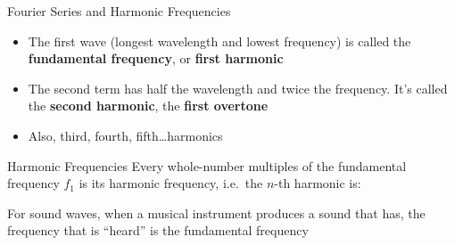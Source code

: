 \documentclass[12pt,aspectratio=169]{beamer}
\newcommand{\eq}[2]{\vspace{#1}{\Large\begin{displaymath}#2\end{displaymath}}}
\begin{document}
\begin{frame}{Fourier Series and Harmonic Frequencies}
  \begin{center}
    \vspace{-.3in}
    \hspace{.15in}
    \hspace{.15in}
  \end{center}

  \vspace{-.2in}
  \begin{itemize}
  \item The first wave (longest wavelength and lowest frequency) is called the
    \textbf{fundamental frequency}, or \textbf{first harmonic}
  \item The second term has half the wavelength and twice the frequency. It's
    called the \textbf{second harmonic}, the \textbf{first overtone}
  \item Also, third, fourth, fifth\ldots harmonics
  \end{itemize}
\end{frame}



\begin{frame}{Harmonic Frequencies}
  Every whole-number multiples of the fundamental frequency $f_1$ is its
  harmonic frequency, i.e.\ the $n$-th harmonic is:

  \eq{-.25in}{
    \boxed{f_n=nf_1}\quad n=1,2,3,\ldots
  }
  For sound waves, when a musical instrument produces a sound that has, the
  frequency that is ``heard'' is the fundamental frequency
\end{frame}
\end{document}
